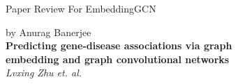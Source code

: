 \begin{center}
        
    \Large{Paper Review For EmbeddingGCN} \\
    \author{}{by Anurag Banerjee}\\
    
    \vspace{1em}
    \LARGE{\textbf{Predicting gene-disease associations via graph\\embedding and
    graph convolutional networks}\cite{embedGCN}} \\
    \Large{\textit{Lvxing Zhu et. al.}} \\

\end{center}